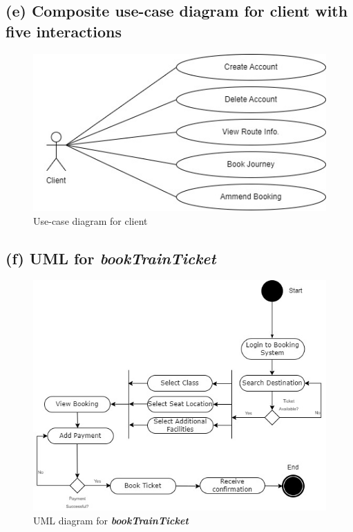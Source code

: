 \documentclass{article}
\begin{document}
\subsection{(e) Composite use-case diagram for client with five interactions}
\begin{figure}[h]
	\centering
	\includegraphics[scale=0.6]{2_e_use_case_diagram_client.jpg}
	\caption{Use-case diagram for client}
	\label{fig:use_case_client}
	\end{figure}
\newpage
\subsection{(f) UML for \textit{bookTrainTicket}}
\begin{figure}[h]
	\centering
	\includegraphics[scale=0.6]{2_f_UML_bookTrainTicket.jpg}
	\caption{UML diagram for \textbf{\textit{bookTrainTicket}}}
	\label{fig:UML_bookTrainTicket}
\end{figure}
\newpage
\end{document}
